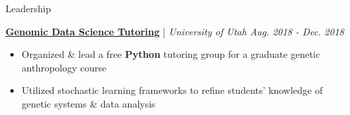 \documentclass{resume/resume}
\begin{document}
\begin{rSection}{Leadership}

  \href{http://content.csbs.utah.edu/~rogers/ant5221/lab/manual.pdf}{\bf Genomic Data Science Tutoring} | {\em University of Utah \hfill Aug. 2018 - Dec. 2018}
  \vspace{-6pt}
  \begin{itemize}[nosep]
    \item Organized \& lead a free {\bf Python} tutoring group for a graduate genetic anthropology course
    \item Utilized stochastic learning frameworks to refine students' knowledge of genetic systems \& data analysis
  \end{itemize}


\end{rSection}

\end{document}
